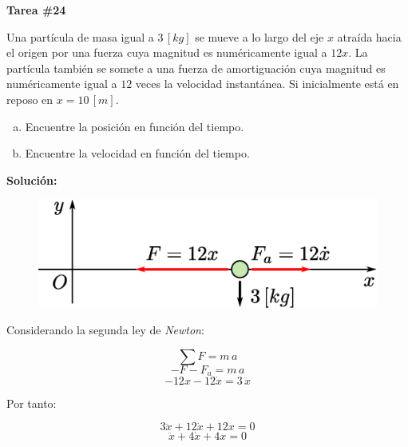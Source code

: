 \documentclass[letter,11pt]{article}
\begin{document}
\begin{center}
    {\Large \bf{Tarea \#24}}
\end{center}

Una partícula de masa igual a $3\, [kg]$ se mueve a lo largo del eje $x$ atraída
hacia el origen por una fuerza cuya magnitud es numéricamente igual a $12x$. La
partícula también se somete a una fuerza de amortiguación cuya magnitud es
numéricamente igual a $12$ veces la velocidad instantánea. Si inicialmente está
en reposo en $x = 10\, [m]$.

\begin{enumerate}[a)]
    \item Encuentre la posición en función del tiempo.
    \item Encuentre la velocidad en función del tiempo.
\end{enumerate}

\vspace{0.5cm}
\textbf{Solución:} \\

\begin{figure}[!h]
\centering
\includegraphics[scale=0.40]{resources/f1.eps}
\end{figure}

Considerando la segunda ley de \emph{Newton}:

\begin{equation*}
    \sum F = m\, a
\end{equation*}
\begin{equation*}
    - F - F_a = m\, a
\end{equation*}
\begin{equation*}
    - 12x - 12\dot{x} = 3\, \ddot{x}
\end{equation*}

Por tanto:

\begin{equation*}
    3 \ddot{x} + 12 \dot{x} + 12 x = 0
\end{equation*}
\begin{equation}
    \ddot{x} + 4 \dot{x} + 4 x = 0
\end{equation}
\end{document}
